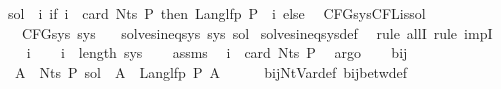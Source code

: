\begin{isabellebody}
\begin{isamarkuptext}
\end{isamarkuptext}\isamarkuptrue%
\isamarkupfalse%
\ {\isachardoublequoteopen}sol\ {\isasymequiv}\ {\isasymlambda}i{\isachardot}{\kern0pt}\ if\ i\ {\isacharless}{\kern0pt}\ card\ {\isacharparenleft}{\kern0pt}Nts\ P{\isacharparenright}{\kern0pt}\ then\ Lang{\isacharunderscore}{\kern0pt}lfp\ P\ {\isacharparenleft}{\kern0pt}{\isasymgamma}\ i{\isacharparenright}{\kern0pt}\ else\ {\isacharbraceleft}{\kern0pt}{\isacharbraceright}{\kern0pt}{\isachardoublequoteclose}\isanewline
\isanewline
{}\isamarkupfalse%
\ CFG{\isacharunderscore}{\kern0pt}sys{\isacharunderscore}{\kern0pt}CFL{\isacharunderscore}{\kern0pt}is{\isacharunderscore}{\kern0pt}sol{\isacharcolon}{\kern0pt}\isanewline
\ \ \ {\isachardoublequoteopen}CFG{\isacharunderscore}{\kern0pt}sys\ sys{\isachardoublequoteclose}\isanewline
\ \ \ {\isachardoublequoteopen}solves{\isacharunderscore}{\kern0pt}ineq{\isacharunderscore}{\kern0pt}sys\ sys\ sol{\isachardoublequoteclose}\isanewline
%
\isadelimproof
%
\endisadelimproof
%
\isatagproof
{}\isamarkupfalse%
\ solves{\isacharunderscore}{\kern0pt}ineq{\isacharunderscore}{\kern0pt}sys{\isacharunderscore}{\kern0pt}def\ \isamarkupfalse%
\ {\isacharparenleft}{\kern0pt}rule\ allI{\isacharcomma}{\kern0pt}\ rule\ impI{\isacharparenright}{\kern0pt}\isanewline
\ \ \isamarkupfalse%
\ i\isanewline
\ \ \isamarkupfalse%
\ {\isachardoublequoteopen}i\ {\isacharless}{\kern0pt}\ length\ sys{\isachardoublequoteclose}\isanewline
\ \ \isamarkupfalse%
\ assms\ \isamarkupfalse%
\ {\isachardoublequoteopen}i\ {\isacharless}{\kern0pt}\ card\ {\isacharparenleft}{\kern0pt}Nts\ P{\isacharparenright}{\kern0pt}{\isachardoublequoteclose}\ \isamarkupfalse%
\ argo\isanewline
\ \ \isamarkupfalse%
\ bij{\isacharunderscore}{\kern0pt}{\isasymgamma}{\isacharunderscore}{\kern0pt}{\isasymgamma}{\isacharprime}{\kern0pt}\ \isamarkupfalse%
\ {\isacharasterisk}{\kern0pt}{\isacharcolon}{\kern0pt}\ {\isachardoublequoteopen}{\isasymforall}A\ {\isasymin}\ Nts\ P{\isachardot}{\kern0pt}\ sol\ {\isacharparenleft}{\kern0pt}{\isasymgamma}{\isacharprime}{\kern0pt}\ A{\isacharparenright}{\kern0pt}\ {\isacharequal}{\kern0pt}\ Lang{\isacharunderscore}{\kern0pt}lfp\ P\ A{\isachardoublequoteclose}\isanewline
\ \ \ \ \isamarkupfalse%
\ bij{\isacharunderscore}{\kern0pt}Nt{\isacharunderscore}{\kern0pt}Var{\isacharunderscore}{\kern0pt}def\ bij{\isacharunderscore}{\kern0pt}betw{\isacharunderscore}{\kern0pt}def\ \isamarkupfalse%

\end{isabellebody}
